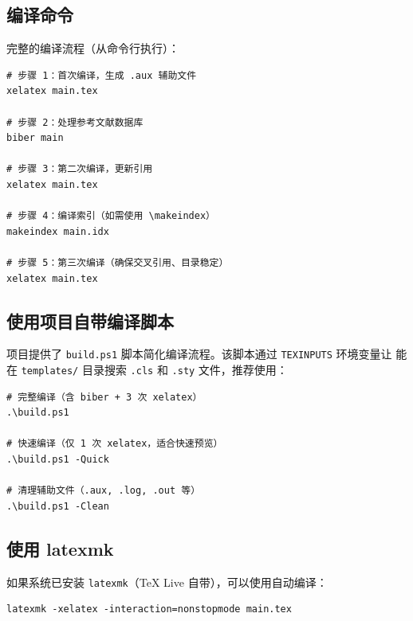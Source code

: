 
\subsection{编译命令}

完整的编译流程（从命令行执行）：

\begin{lstlisting}[caption={完整编译命令（Windows PowerShell）}, label={lst:compile}]
# 步骤 1：首次编译，生成 .aux 辅助文件
xelatex main.tex

# 步骤 2：处理参考文献数据库
biber main

# 步骤 3：第二次编译，更新引用
xelatex main.tex

# 步骤 4：编译索引（如需使用 \makeindex）
makeindex main.idx

# 步骤 5：第三次编译（确保交叉引用、目录稳定）
xelatex main.tex
\end{lstlisting}

\subsection{使用项目自带编译脚本}

项目提供了 \texttt{build.ps1} 脚本简化编译流程。该脚本通过
\texttt{TEXINPUTS} 环境变量让 \XeLaTeX{} 能在 \texttt{templates/}
目录搜索 \texttt{.cls} 和 \texttt{.sty} 文件，推荐使用：

\begin{lstlisting}[caption={使用 build.ps1 编译}, label={lst:buildps}]
# 完整编译（含 biber + 3 次 xelatex）
.\build.ps1

# 快速编译（仅 1 次 xelatex，适合快速预览）
.\build.ps1 -Quick

# 清理辅助文件（.aux, .log, .out 等）
.\build.ps1 -Clean
\end{lstlisting}

\subsection{使用 latexmk}

如果系统已安装 \texttt{latexmk}（TeX Live 自带），可以使用自动编译：

\begin{lstlisting}[style=kaolstplain]
latexmk -xelatex -interaction=nonstopmode main.tex
\end{lstlisting}

